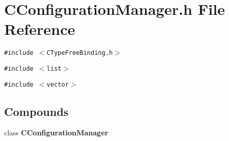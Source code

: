 \section{CConfiguration\-Manager.h File Reference}
\label{CConfigurationManager_8h}
{\tt \#include $<$CType\-Free\-Binding.h$>$}\par
{\tt \#include $<$list$>$}\par
{\tt \#include $<$vector$>$}\par
\subsection*{Compounds}
\begin{CompactItemize}
\item 
class {\bf CConfiguration\-Manager}
\end{CompactItemize}
